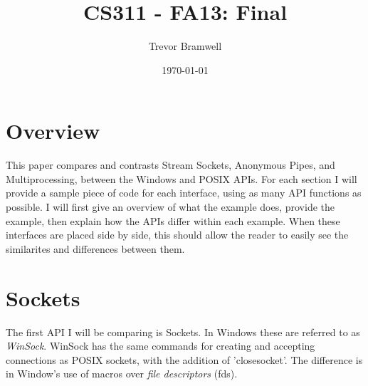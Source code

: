 \documentclass[letterpaper,10pt]{article}
\title{CS311 - FA13: Final}
\date{\today}
\author{Trevor Bramwell}
\begin{document}
\maketitle

\section{Overview}

This paper compares and contrasts Stream Sockets, Anonymous Pipes, and
Multiprocessing, between the Windows and POSIX APIs. For each section I
will provide a sample piece of code for each interface, using as many
API functions as possible. I will first give an overview of what the
example does, provide the example, then explain how the APIs differ
within each example. When these interfaces are placed side by side, this
should allow the reader to easily see the similarites and differences
between them.

\section{Sockets}

The first API I will be comparing is Sockets. In Windows these are
referred to as \emph{WinSock}. WinSock has the same commands for
creating and accepting connections as POSIX sockets, with the addition
of 'closesocket'. The difference is in Window's use of macros over
\emph{file descriptors} (fds).
\end{document}
